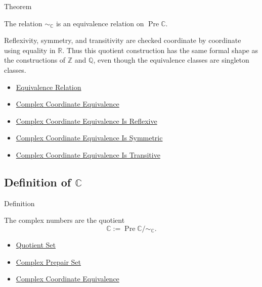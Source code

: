 \begin{theorembox}{Theorem}
\begin{theorem}
\label{thm:complex-coordinate-equivalence-relation}
The relation $\sim_{\mathbb{C}}$ is an equivalence relation on
\(\operatorname{Pre}\mathbb{C}\).
\end{theorem}
\end{theorembox}

\begin{remark*}
Reflexivity, symmetry, and transitivity are checked coordinate by coordinate
using equality in \(\mathbb{R}\). Thus this quotient construction has the same
formal shape as the constructions of \(\mathbb{Z}\) and \(\mathbb{Q}\), even
though the equivalence classes are singleton classes.
\end{remark*}

\begin{dependencies}
\begin{itemize}
  \item \hyperref[def:equivalence-relation]{Equivalence Relation}
  \item \hyperref[def:complex-coordinate-equivalence]{Complex Coordinate Equivalence}
  \item \hyperref[lem:complex-coordinate-equivalence-reflexive]{Complex Coordinate Equivalence Is Reflexive}
  \item \hyperref[lem:complex-coordinate-equivalence-symmetric]{Complex Coordinate Equivalence Is Symmetric}
  \item \hyperref[lem:complex-coordinate-equivalence-transitive]{Complex Coordinate Equivalence Is Transitive}
\end{itemize}
\end{dependencies}

\subsection*{Definition of $\mathbb{C}$}

\begin{definitionbox}{Definition}
\begin{definition}
\label{def:complex-numbers}
The complex numbers are the quotient
\[
\mathbb{C}:=\operatorname{Pre}\mathbb{C}/{\sim_{\mathbb{C}}}.
\]
\end{definition}
\end{definitionbox}

\begin{dependencies}
\begin{itemize}
  \item \hyperref[def:quotient-set]{Quotient Set}
  \item \hyperref[def:complex-prepair-set]{Complex Prepair Set}
  \item \hyperref[def:complex-coordinate-equivalence]{Complex Coordinate Equivalence}
\end{itemize}
\end{dependencies}

